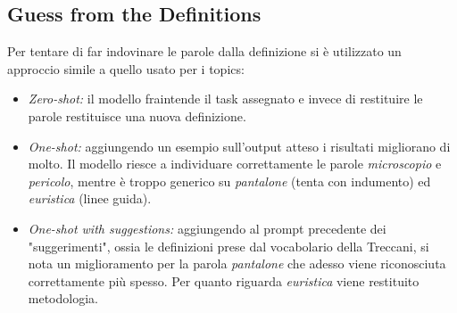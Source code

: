 \subsection{Guess from the Definitions}

Per tentare di far indovinare le parole dalla definizione si è utilizzato un approccio simile a quello usato per i topics: 

\begin{itemize}
  \item \textit{Zero-shot:} il modello fraintende il task assegnato e invece di restituire le parole restituisce una nuova definizione.
  \item \textit{One-shot:} aggiungendo un esempio sull'output atteso i risultati migliorano di molto. Il modello riesce a individuare correttamente le parole \textit{microscopio} e \textit{pericolo}, mentre è troppo generico su \textit{pantalone} (tenta con indumento) ed \textit{euristica} (linee guida).
  \item \textit{One-shot with suggestions:} aggiungendo al prompt precedente dei "suggerimenti", ossia le definizioni prese dal vocabolario della Treccani, si nota un miglioramento per la parola \textit{pantalone} che adesso viene riconosciuta correttamente più spesso. Per quanto riguarda \textit{euristica} viene restituito metodologia. 
\end{itemize}
